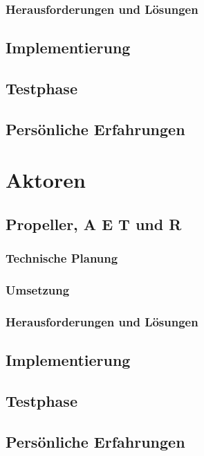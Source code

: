   \subsection{Herausforderungen und Lösungen}

\section{Implementierung}

\section{Testphase}

\section{Persönliche Erfahrungen}

\chapter{Aktoren}
\renewcommand{\kapitelautor}{Autor: Lucas Ullrich}

\section{Propeller, A E T und R}

  \subsection{Technische Planung}

  \subsection{Umsetzung}

  \subsection{Herausforderungen und Lösungen}

\section{Implementierung}

\section{Testphase}

\section{Persönliche Erfahrungen}
